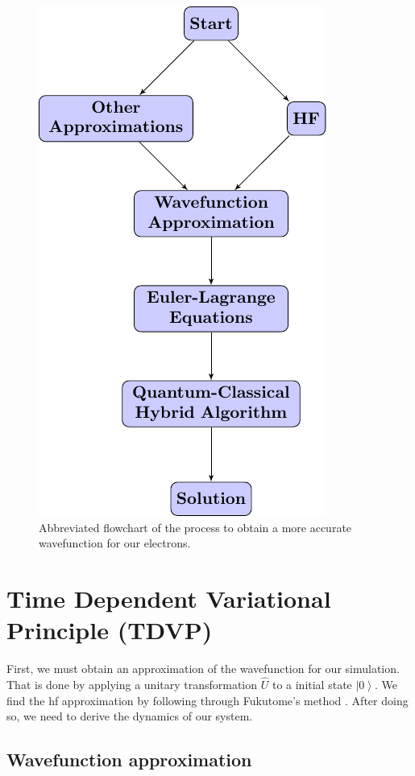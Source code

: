 \documentclass{aux/ttuthes2007}
\newcommand{\ket}[1]{\ensuremath{\left|#1\right\rangle}}
\begin{document}
\begin{figure}[hb!]
	\centering
  \includegraphics[width=.7\linewidth]{flowcharts/flowchart1.pdf}
  \caption{Abbreviated flowchart of the process to obtain a more accurate wavefunction for our electrons.}
  \label{fig:flowchart1}
\end{figure}

\section{\textbf{Time Dependent Variational Principle (TDVP)}}\label{sec:tdvp}
First, we must obtain an approximation of the wavefunction for our simulation. That is done by applying a unitary transformation $\hat U$ to a initial state $\ket 0$.
We find the \gls {hf} approximation by following through Fukutome's method . After doing so, we need to derive the dynamics of our system.

\subsection{\textbf{Wavefunction approximation}}
\end{document}
